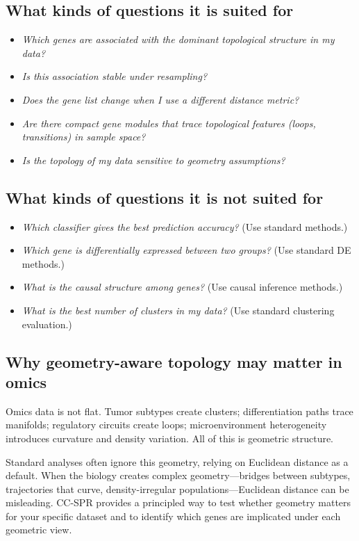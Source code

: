 \documentclass[11pt]{article}
\begin{document}
\subsection{What kinds of questions it is suited for}

\begin{itemize}[leftmargin=1.5em]
\item \emph{Which genes are associated with the dominant topological structure in my data?}
\item \emph{Is this association stable under resampling?}
\item \emph{Does the gene list change when I use a different distance metric?}
\item \emph{Are there compact gene modules that trace topological features (loops, transitions) in sample space?}
\item \emph{Is the topology of my data sensitive to geometry assumptions?}
\end{itemize}

\subsection{What kinds of questions it is not suited for}

\begin{itemize}[leftmargin=1.5em]
\item \emph{Which classifier gives the best prediction accuracy?} (Use standard methods.)
\item \emph{Which gene is differentially expressed between two groups?} (Use standard DE methods.)
\item \emph{What is the causal structure among genes?} (Use causal inference methods.)
\item \emph{What is the best number of clusters in my data?} (Use standard clustering evaluation.)
\end{itemize}

\subsection{Why geometry-aware topology may matter in omics}

Omics data is not flat.
Tumor subtypes create clusters; differentiation paths trace manifolds; regulatory circuits create loops; microenvironment heterogeneity introduces curvature and density variation.
All of this is geometric structure.

Standard analyses often ignore this geometry, relying on Euclidean distance as a default.
When the biology creates complex geometry---bridges between subtypes, trajectories that curve, density-irregular populations---Euclidean distance can be misleading.
CC-SPR provides a principled way to test whether geometry matters for your specific dataset and to identify which genes are implicated under each geometric view.
\end{document}
